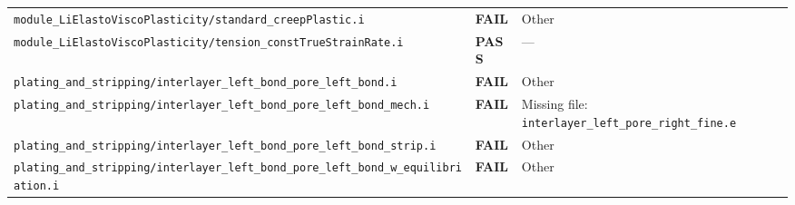 \documentclass[10pt,letterpaper]{article}
\newcommand{\PASS}{\textcolor{passgreen}{\textbf{PASS}}}
\newcommand{\FAIL}{\textcolor{failred}{\textbf{FAIL}}}
\newcommand{\code}[1]{\texttt{\small #1}}
\begin{document}
\begin{longtable}{p{} l p{}}
\code{module\_LiElastoViscoPlasticity/standard\_creepPlastic.i} & \FAIL & Other \\
\code{module\_LiElastoViscoPlasticity/tension\_constTrueStrainRate.i} & \PASS & --- \\
\code{plating\_and\_stripping/interlayer\_left\_bond\_pore\_left\_bond.i} & \FAIL & Other \\
\code{plating\_and\_stripping/interlayer\_left\_bond\_pore\_left\_bond\_mech.i} & \FAIL & Missing file: \code{interlayer\_left\_pore\_right\_fine.e} \\
\code{plating\_and\_stripping/interlayer\_left\_bond\_pore\_left\_bond\_strip.i} & \FAIL & Other \\
\code{plating\_and\_stripping/interlayer\_left\_bond\_pore\_left\_bond\_w\_equilibriation.i} & \FAIL & Other \\
\bottomrule
\end{longtable}
\end{document}
